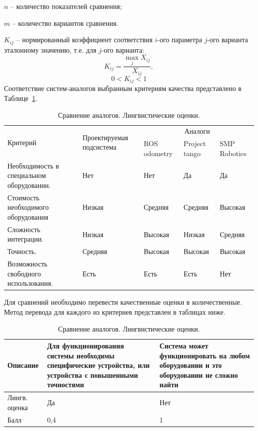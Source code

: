 $n$ – количество показателей сравнения;

$m$ – количество вариантов сравнения.

$K_{ij}$ – нормированный коэффициент соответствия $i$-ого параметра $j$-ого варианта эталонному значению, т.е. для $j$-ого варианта:
$$ K_{ij} = \frac{\max_{j} X_{ij}} {X_{ij}}, $$
$$ 0 < K_{ij} < 1 $$
Соответствие систем-аналогов выбранным критериям качества представлено в Таблице~\ref{tab:srav_ling}.

\begin{table}[!htb]
	\caption{Сравнение аналогов. Лингвистические оценки.}\label{tab:srav_ling}
    \centering
	\begin{tabular}{|p{4cm}|p{4cm}|p{2cm}|p{2cm}|p{2cm}|}
	\hline 
	\multirow{2}{4cm}{Критерий} & \multirow{2}{4cm}{Проектируемая подсистема} & 	\multicolumn{3}{c|}{Аналоги}\\ 
	\cline{3-5}
	 &   & ROS odometry & Project tango & SMP Robotics \\ 
	\hline 
	Необходимость в специальном оборудовании. & Нет & Нет & Да & Да \\ 
	\hline 
	Стоимость необходимого оборудования & Низкая & Средняя & Средняя & Высокая \\ 	
	\hline 
	Сложность интеграции. & Низкая & Высокая & Низкая & Средняя \\
	\hline 
	Точность. & Средняя & Высокая & Высокая & Высокая \\ 
	\hline 
	Возможность свободного использования. & Есть & Есть & Есть & Нет \\ 
	\hline 
	\end{tabular}
\end{table} 

Для сравнений необходимо перевести качественные оценки в количественные. Метод перевода для каждого из критериев представлен в таблицах ниже.

\begin{table}[!htb]
	\caption{Сравнение аналогов. Лингвистические оценки.}
    \centering
	\begin{tabular}{|p{3cm}|p{6cm}|p{6cm}|}
	\hline 
	Описание & Для функционирования системы необходимы специфические устройства, или устройства с повышенными точностями & Система может функционировать на любом оборудовании и это оборудовании не сложно найти \\ 
	\hline 
	Лингв. оценка & Да & Нет \\ 
	\hline 
	Балл & 0,4 & 1 \\ 
	\hline 
	\end{tabular} 
\end{table} 


